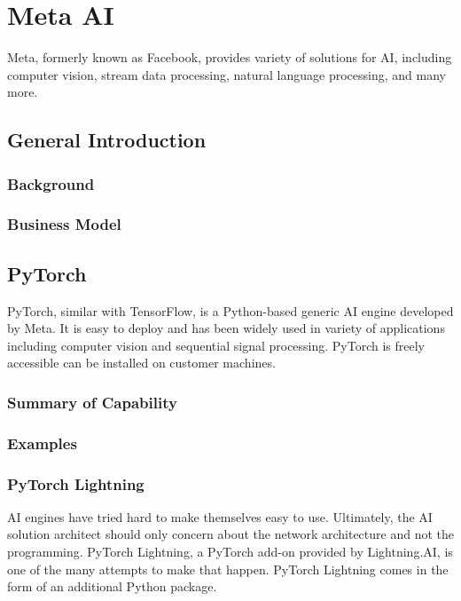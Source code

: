 \chapter{Meta AI} \label{ch:metaai}

Meta, formerly known as Facebook, provides variety of solutions for AI, including computer vision, stream data processing, natural language processing, and many more.

\section{General Introduction}

\subsection{Background}

\subsection{Business Model}

\section{PyTorch}

PyTorch, similar with TensorFlow, is a Python-based generic AI engine developed by Meta. It is easy to deploy and has been widely used in variety of applications including computer vision and sequential signal processing. PyTorch is freely accessible can be installed on customer machines.

\subsection{Summary of Capability}

\subsection{Examples}

\subsection{PyTorch Lightning}

AI engines have tried hard to make themselves easy to use. Ultimately, the AI solution architect should only concern about the network architecture and not the programming. PyTorch Lightning, a PyTorch add-on provided by Lightning.AI, is one of the many attempts to make that happen. PyTorch Lightning comes in the form of an additional Python package.


